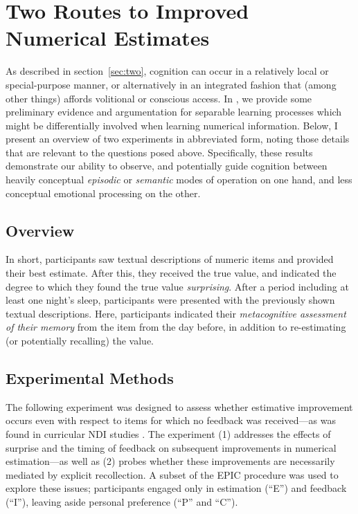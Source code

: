 \graphicspath{{two-routes-estimation/}}

\chapter{Two Routes to Improved Numerical Estimates}
\label{chap:two}

As described in section~\ref{sec:two}, cognition can occur in a relatively local
or special-purpose manner, or alternatively in an integrated fashion that (among
other things) affords volitional or conscious access. In
\citeauthor{clark_known_2010}, we provide some preliminary evidence and argumentation
for separable learning processes which might be differentially involved when
learning numerical information. Below, I present an overview of two experiments
in abbreviated form, noting those details that are relevant to the questions
posed above. Specifically, these results demonstrate our ability to observe, and
potentially guide cognition between heavily conceptual \emph{episodic} or
\emph{semantic} modes of operation on one hand, and less conceptual emotional
processing on the other.

\section{Overview}

In short, participants saw textual descriptions of numeric items and provided
their best estimate. After this, they received the true value, and indicated the
degree to which they found the true value \emph{surprising}. After a period
including at least one night's sleep, participants were presented with the
previously shown textual descriptions.  Here, participants indicated their
\emph{metacognitive assessment of their memory} from the item from the day
before, in addition to re-estimating (or potentially recalling) the value.

\section{Experimental Methods}

The following experiment was designed to assess whether estimative improvement
occurs even with respect to items for which no feedback was received---as was
found in curricular NDI studies
\cite[e.g.,][]{munnich_numerically-driven_2004,ranney_designing_2008}. The
experiment (1) addresses the effects of surprise and the timing of feedback on
subsequent improvements in numerical estimation---as well as (2) probes whether
these improvements are necessarily mediated by explicit recollection. A subset
of the EPIC procedure was used to explore these issues; participants engaged
only in estimation (``E'') and feedback (``I''), leaving aside personal
preference (``P'' and ``C''). 

